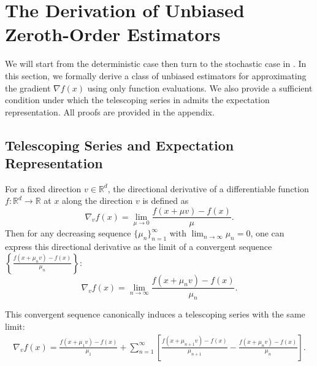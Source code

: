 \documentclass{article}
\theoremstyle{definition}
\theoremstyle{plain}
\theoremstyle{remark}
\begin{document}
\section{The Derivation of Unbiased Zeroth-Order Estimators}\label{sec:min-var} 

We will start from the deterministic case then turn to the stochastic case in . In this section, we formally derive a class of unbiased estimators for approximating the gradient $\nabla f(x)$ using only function evaluations. We also provide a sufficient condition under which the telescoping series in  admits the expectation representation. All proofs are provided in the appendix.
 

\subsection{Telescoping Series and Expectation Representation} 
For a fixed direction \(v\in\mathbb{R}^d\), the directional derivative of a differentiable function \(f:\mathbb{R}^d\to\mathbb{R}\) at \(x\) along the direction $v$ is defined as $$\nabla_v f(x) = \lim_{\mu\to 0} \frac{f(x+\mu v)-f(x)}{\mu}.$$ 
Then for any decreasing sequence \(\{\mu_n\}_{n=1}^\infty\) with \(\lim_{n \to \infty} \mu_n = 0\), one can express this directional derivative as the limit of a convergent sequence $\left\{ \frac{f(x+\mu_n v) - f(x)}{\mu_n} \right\}$: $$\nabla_v f(x) = \lim_{n \to \infty} \frac{f(x+\mu_n v) - f(x)}{\mu_n} . $$

This convergent sequence canonically induces a telescoping series with the same limit:
\begin{align}\label{eq:series}
    \nabla_v f(x) =\frac{f(x+\mu_1 v)-f(x)}{\mu_1}  + \sum_{n=1}^\infty \left[ \frac{f(x+\mu_{n+1} v)-f(x)}{\mu_{n+1}} - \frac{f(x+\mu_n v)-f(x)}{\mu_n} \right].
\end{align}
\end{document}
